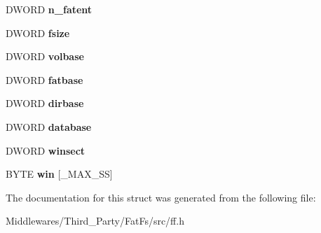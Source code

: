 \begin{DoxyCompactItemize}
\item 
\mbox{\label{struct_f_a_t_f_s_a8da50eeba6469bc20d60ca0cf9a1307c}} 
D\+W\+O\+RD {\bfseries n\+\_\+fatent}
\item 
\mbox{\label{struct_f_a_t_f_s_a53e9560659f14e66f306c2c444198bf3}} 
D\+W\+O\+RD {\bfseries fsize}
\item 
\mbox{\label{struct_f_a_t_f_s_a8f0ca578755749d204f59dc83f1a7649}} 
D\+W\+O\+RD {\bfseries volbase}
\item 
\mbox{\label{struct_f_a_t_f_s_a848fba02c4aabe02ef2984e578f33d64}} 
D\+W\+O\+RD {\bfseries fatbase}
\item 
\mbox{\label{struct_f_a_t_f_s_a3f72fd998dbcce4652a85a81fe944bc4}} 
D\+W\+O\+RD {\bfseries dirbase}
\item 
\mbox{\label{struct_f_a_t_f_s_a5b6c0bc2e9fd2ae8ef714210a74a2d5d}} 
D\+W\+O\+RD {\bfseries database}
\item 
\mbox{\label{struct_f_a_t_f_s_ac60e69c00e6bf7c25febfbac4dc1476b}} 
D\+W\+O\+RD {\bfseries winsect}
\item 
\mbox{\label{struct_f_a_t_f_s_a7cc35a593465e727ab87723c14610644}} 
B\+Y\+TE {\bfseries win} \mbox{[}\+\_\+\+M\+A\+X\+\_\+\+SS\mbox{]}
\end{DoxyCompactItemize}


The documentation for this struct was generated from the following file\+:\begin{DoxyCompactItemize}
\item 
Middlewares/\+Third\+\_\+\+Party/\+Fat\+Fs/src/ff.\+h\end{DoxyCompactItemize}
